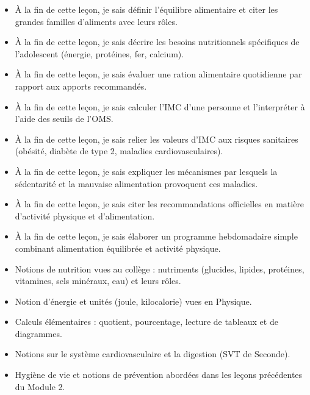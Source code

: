 \documentclass[11pt]{article}
\begin{document}
\begin{objectifs}
\begin{itemize}
\item À la fin de cette leçon, je sais définir l'équilibre alimentaire et citer les grandes familles d'aliments avec leurs rôles.
\item À la fin de cette leçon, je sais décrire les besoins nutritionnels spécifiques de l'adolescent (énergie, protéines, fer, calcium).
\item À la fin de cette leçon, je sais évaluer une ration alimentaire quotidienne par rapport aux apports recommandés.
\item À la fin de cette leçon, je sais calculer l'IMC d'une personne et l'interpréter à l'aide des seuils de l'OMS.
\item À la fin de cette leçon, je sais relier les valeurs d'IMC aux risques sanitaires (obésité, diabète de type 2, maladies cardiovasculaires).
\item À la fin de cette leçon, je sais expliquer les mécanismes par lesquels la sédentarité et la mauvaise alimentation provoquent ces maladies.
\item À la fin de cette leçon, je sais citer les recommandations officielles en matière d'activité physique et d'alimentation.
\item À la fin de cette leçon, je sais élaborer un programme hebdomadaire simple combinant alimentation équilibrée et activité physique.
\end{itemize}
\end{objectifs}

\begin{prerequis}
\begin{itemize}
\item Notions de nutrition vues au collège : nutriments (glucides, lipides, protéines, vitamines, sels minéraux, eau) et leurs rôles.
\item Notion d'énergie et unités (joule, kilocalorie) vues en Physique.
\item Calculs élémentaires : quotient, pourcentage, lecture de tableaux et de diagrammes.
\item Notions sur le système cardiovasculaire et la digestion (SVT de Seconde).
\item Hygiène de vie et notions de prévention abordées dans les leçons précédentes du Module 2.
\end{itemize}
\end{prerequis}

\newpage
\end{document}
